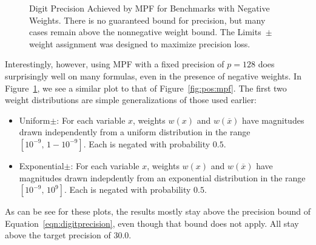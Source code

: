 \documentclass[letterpaper,USenglish,cleveref, autoref, thm-restate]{lipics-v2021}
\newcommand{\obar}[1]{\overline{#1}}
\begin{document}
\begin{figure}
\caption{Digit Precision Achieved by MPF for Benchmarks with Negative Weights.  There is no guaranteed bound for precision, but many cases remain above the nonnegative weight bound.
The Limits~$\pm$ weight assignment was designed to maximize precision loss.}
\label{fig:posneg:mpf}
\end{figure}

Interestingly, however, using MPF with a fixed precision of $p=128$ does surprisingly well on many formulas, even in the presence of negative weights.
In Figure~\ref{fig:posneg:mpf}, we see a similar plot to that of Figure~\ref{fig:pos:mpf}.  The first two weight distributions are simple generalizations of those used earlier:
\begin{itemize}
\item \textsf{Uniform$\pm$}: For each variable $x$, weights $w(x)$ and $w(\obar{x})$ have magnitudes drawn independently
from a uniform distribution in the range  $[10^{-9},\,1-10^{-9}]$.  Each is negated with probability $0.5$.
\item \textsf{Exponential$\pm$}: For each variable $x$, weights $w(x)$ and $w(\obar{x})$ have magnitudes
  drawn indepdently from an exponential distribution in the range $[10^{-9},\,10^{9}]$.  Each is negated with probability $0.5$.
\end{itemize}
As can be see for these plots, the results mostly stay above the precision bound of Equation~\ref{eqn:digitprecision},
even though that bound does not apply.  All stay above the target precision of $30.0$.
\end{document}
